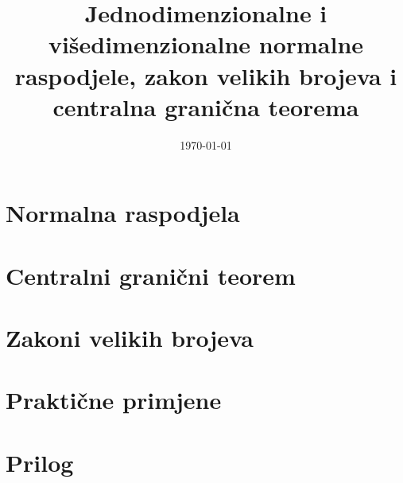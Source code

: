 \documentclass[11pt]{article}
\date{\today}
\title{Jednodimenzionalne i višedimenzionalne normalne raspodjele, zakon velikih
brojeva i centralna granična teorema}
\begin{document}
\maketitle
\tableofcontents

\section{Normalna raspodjela}


\section{Centralni granični teorem}


\section{Zakoni velikih brojeva}


\section{Praktične primjene}

\section{Prilog}

\end{document}
